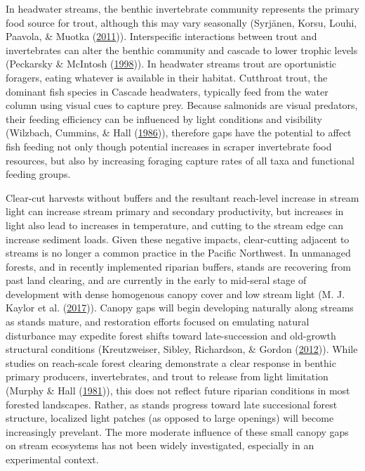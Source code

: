 \documentclass[double,12pt]{beavtex}
\begin{document}
  In headwater streams, the benthic invertebrate community represents the
  primary food source for trout, although this may vary seasonally
  (Syrjänen, Korsu, Louhi, Paavola, \& Muotka
  (\protect\hyperlink{ref-Syrjanen2011}{2011})). Interspecific
  interactions between trout and invertebrates can alter the benthic
  community and cascade to lower trophic levels (Peckarsky \& McIntosh
  (\protect\hyperlink{ref-Peckarsky1998}{1998})). In headwater streams
  trout are oportunistic foragers, eating whatever is available in their
  habitat. Cutthroat trout, the dominant fish species in Cascade
  headwaters, typically feed from the water column using visual cues to
  capture prey. Because salmonids are visual predators, their feeding
  efficiency can be influenced by light conditions and visibility
  (Wilzbach, Cummins, \& Hall
  (\protect\hyperlink{ref-Wilzbach1986}{1986})), therefore gaps have the
  potential to affect fish feeding not only though potential increases in
  scraper invertebrate food resources, but also by increasing foraging
  capture rates of all taxa and functional feeding groups.
  
  Clear-cut harvests without buffers and the resultant reach-level
  increase in stream light can increase stream primary and secondary
  productivity, but increases in light also lead to increases in
  temperature, and cutting to the stream edge can increase sediment loads.
  Given these negative impacts, clear-cutting adjacent to streams is no
  longer a common practice in the Pacific Northwest. In unmanaged forests,
  and in recently implemented riparian buffers, stands are recovering from
  past land clearing, and are currently in the early to mid-seral stage of
  development with dense homogenous canopy cover and low stream light (M.
  J. Kaylor et al. (\protect\hyperlink{ref-Kaylor2017FS}{2017})). Canopy
  gaps will begin developing naturally along streams as stands mature, and
  restoration efforts focused on emulating natural disturbance may
  expedite forest shifts toward late-succession and old-growth structural
  conditions (Kreutzweiser, Sibley, Richardson, \& Gordon
  (\protect\hyperlink{ref-Kreutzweiser2012}{2012})). While studies on
  reach-scale forest clearing demonstrate a clear response in benthic
  primary producers, invertebrates, and trout to release from light
  limitation (Murphy \& Hall (\protect\hyperlink{ref-Murphy1981}{1981})),
  this does not reflect future riparian conditions in most forested
  landscapes. Rather, as stands progress toward late succesional forest
  structure, localized light patches (as opposed to large openings) will
  become increasingly prevelant. The more moderate influence of these
  small canopy gaps on stream ecosystems has not been widely investigated,
  especially in an experimental context.
  
\end{document}
